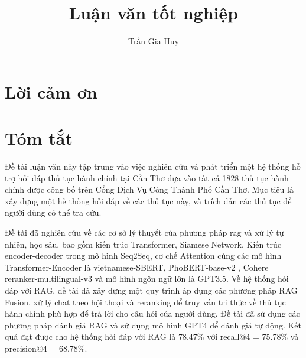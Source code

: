 \documentclass[a4paper, 12pt, openany]{book}
\title{Luận văn tốt nghiệp}
\author{Trần Gia Huy}
\begin{document}

\begin{titlepage}

    
\end{titlepage}



\newpage



\newpage



\chapter*{Lời cảm ơn}



\chapter*{Tóm tắt}

Đề tài luận văn này tập trung vào việc nghiên cứu và phát triển một hệ thống hỗ trợ hỏi đáp thủ tục hành chính tại Cần Thơ dựa
vào tất cả 1828 thủ tục hành chính được công bố trên Cổng Dịch Vụ Công Thành Phố Cần Thơ. Mục tiêu là xây dựng một hế thống hỏi đáp về các thủ tục này,
và trích dẫn các thủ tục để người dùng có thể tra cứu.

Đề tài đã nghiên cứu về các cơ sở lý thuyết của phương pháp \acl{rag} và xử lý tự nhiên, học sâu, bao gồm kiến trúc
Transformer, Siamese Network, Kiến trúc encoder-decoder trong mô hình Seq2Seq, cơ chế Attention cùng các mô hình Transformer-Encoder là vietnamese-SBERT, PhoBERT-base-v2 , Cohere reranker-multilingual-v3 và mô hình ngôn ngữ lớn
là GPT3.5. Về hệ thống hỏi đáp với RAG, đề tài đã xây dựng một quy trình áp dụng các phương pháp RAG Fusion, xử lý chat theo hội thoại và reranking để truy vấn tri thức
về thủ tục hành chính phù hợp để trả lời cho câu hỏi của người dùng. Đề tài đã sử dụng các phương pháp đánh giá RAG và sử dụng mô hình GPT4 để đánh giá tự động. Kết quả đạt được cho hệ thống hỏi đáp với RAG là
78.47\% với recall@4 = 75.78\% và precision@4 = 68.78\%.
\end{document}
